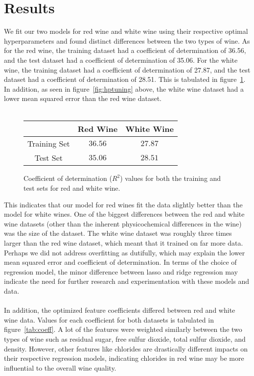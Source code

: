 
\section{Results}
\label{sec:results}

We fit our two models for red wine and white wine using their respective optimal hyperparameters and found distinct differences between the two types of wine. As for the red wine, the training dataset had a coefficient of determination of 36.56, and the test dataset had a coefficient of determination of 35.06. For the white wine, the training dataset had a coefficient of determination of 27.87, and the test dataset had a coefficient of determination of 28.51. This is tabulated in figure~\ref{tab:example}. In addition, as seen in figure~\ref{fig:hptuning} above, the white wine dataset had a lower mean squared error than the red wine dataset. \\\\

\begin{figure}[htb]
  \centering
  \begin{tabular}{|c|c|c|} 
    \hline
     & Red Wine & White Wine \\
    \hline
    Training Set & $36.56$ & $27.87$ \\
    Test Set & $35.06$ & $28.51$\\
    \hline
  \end{tabular}

  \caption{Coefficient of determination ($R^2$) values for both the training and test sets for red and white wine.}
  \label{tab:example}

\end{figure}

This indicates that our model for red wines fit the data slightly better than the model for white wines. One of the biggest differences between the red and white wine datasets (other than the inherent physicochemical differences in the wine) was the size of the dataset. The white wine dataset was roughly three times larger than the red wine dataset, which meant that it trained on far more data. Perhaps we did not address overfitting as dutifully, which may explain the lower mean squared error and coefficient of determination. In terms of the choice of regression model, the minor difference between lasso and ridge regression may indicate the need for further research and experimentation with these models and data. \\\\
In addition, the optimized feature coefficients differed between red and white wine data. Values for each coefficient for both datasets is tabulated in figure~\ref{tab:coeff}. A lot of the features were weighted similarly between the two types of wine such as residual sugar, free sulfur dioxide, total sulfur dioxide, and density. However, other features like chlorides are drastically different impacts on their respective regression models, indicating chlorides in red wine may be more influential to the overall wine quality.


